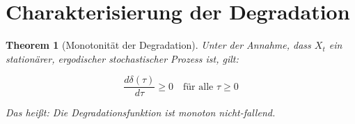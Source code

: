 \documentclass[12pt, a4paper, titlepage]{report}
\newtheorem{theorem}{Theorem}[section]
\theoremstyle{definition}
\theoremstyle{remark}
\begin{document}
\section{Charakterisierung der Degradation}

\begin{theorem}[Monotonität der Degradation]
\label{thm:monotone}
Unter der Annahme, dass $X_t$ ein stationärer, ergodischer stochastischer Prozess ist, gilt:

\begin{equation}
\frac{d\delta(\tau)}{d\tau} \geq 0 \quad \text{für alle } \tau \geq 0
\end{equation}

Das heißt: Die Degradationsfunktion ist monoton nicht-fallend.
\end{theorem}
\end{document}
